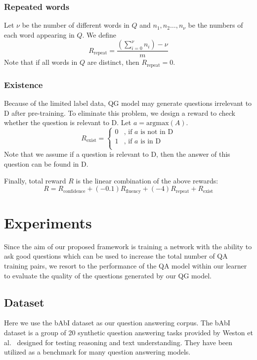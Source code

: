 \documentclass{article}
\begin{document}
\subsubsection{Repeated words}

Let $\nu$ be the number of different words in $Q$ and $n_1,n_2\ldots,n_\nu$ be the numbers of each word appearing in $Q$.
We define
\begin{equation}
    R_{\text{repeat}}=\frac{\left(\sum_{i=0}^{\nu}n_i\right) - \nu}{m}
\end{equation}
Note that if all words in $Q$ are distinct, then $R_{\text{repeat}}=0$.

\subsubsection{Existence}

Because of the limited label data, QG model may generate questions irrelevant to D after pre-training. To eliminate this problem, we design a reward to check whether the question is relevant to D. Let $a=\text{argmax}(A)$.
\begin{equation}
    R_{\text{exist}} = \left\{
\begin{array}{ll}
0 & \text{, if }a \text{ is not in D}\\
1 & \text{, if }a \text{ is in D}\\
\end{array}
\right.
\end{equation}
Note that we assume if a question is relevant to D, then the answer of this question can be found in D.

Finally, total reward $R$ is the linear combination of the above rewards:
\begin{equation}
    R=R_{\text{confidence}}+(-0.1)R_{\text{fluency}}+(-4)R_{\text{repeat}}+R_{\text{exist}}
\end{equation}
\section{Experiments}
\label{sec:experiments}
Since the aim of our proposed framework is training a network with the ability to ask good questions which can be used to increase the total number of QA training pairs, we resort to the performance of the QA model within our learner to evaluate the quality of the questions generated by our QG model.

\subsection{Dataset}
Here we use the bAbI dataset as our question answering corpus. The bAbI dataset is a group of 20 synthetic question answering tasks provided by Weston et al.~\cite{wbcrmjm15:bAbI} designed for testing reasoning and text understanding. They have been utilized as a benchmark for many question answering models.
\end{document}
